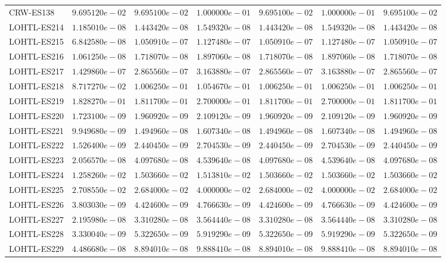 \begin{longtable}{lrrrrrr}
CRW-ES138 & $9.695120e-02$ & $9.695100e-02$ & $1.000000e-01$ & $9.695100e-02$ & $1.000000e-01$ & $9.695100e-02$ \\
LOHTL-ES214 & $1.185010e-08$ & $1.443420e-08$ & $1.549320e-08$ & $1.443420e-08$ & $1.549320e-08$ & $1.443420e-08$ \\
LOHTL-ES215 & $6.842580e-08$ & $1.050910e-07$ & $1.127480e-07$ & $1.050910e-07$ & $1.127480e-07$ & $1.050910e-07$ \\
LOHTL-ES216 & $1.061250e-08$ & $1.718070e-08$ & $1.897060e-08$ & $1.718070e-08$ & $1.897060e-08$ & $1.718070e-08$ \\
LOHTL-ES217 & $1.429860e-07$ & $2.865560e-07$ & $3.163880e-07$ & $2.865560e-07$ & $3.163880e-07$ & $2.865560e-07$ \\
LOHTL-ES218 & $8.717270e-02$ & $1.006250e-01$ & $1.054670e-01$ & $1.006250e-01$ & $1.006250e-01$ & $1.006250e-01$ \\
LOHTL-ES219 & $1.828270e-01$ & $1.811700e-01$ & $2.700000e-01$ & $1.811700e-01$ & $2.700000e-01$ & $1.811700e-01$ \\
LOHTL-ES220 & $1.723100e-09$ & $1.960920e-09$ & $2.109120e-09$ & $1.960920e-09$ & $2.109120e-09$ & $1.960920e-09$ \\
LOHTL-ES221 & $9.949680e-09$ & $1.494960e-08$ & $1.607340e-08$ & $1.494960e-08$ & $1.607340e-08$ & $1.494960e-08$ \\
LOHTL-ES222 & $1.526400e-09$ & $2.440450e-09$ & $2.704530e-09$ & $2.440450e-09$ & $2.704530e-09$ & $2.440450e-09$ \\
LOHTL-ES223 & $2.056570e-08$ & $4.097680e-08$ & $4.539640e-08$ & $4.097680e-08$ & $4.539640e-08$ & $4.097680e-08$ \\
LOHTL-ES224 & $1.258260e-02$ & $1.503660e-02$ & $1.513810e-02$ & $1.503660e-02$ & $1.503660e-02$ & $1.503660e-02$ \\
LOHTL-ES225 & $2.708550e-02$ & $2.684000e-02$ & $4.000000e-02$ & $2.684000e-02$ & $4.000000e-02$ & $2.684000e-02$ \\
LOHTL-ES226 & $3.803030e-09$ & $4.424600e-09$ & $4.766630e-09$ & $4.424600e-09$ & $4.766630e-09$ & $4.424600e-09$ \\
LOHTL-ES227 & $2.195980e-08$ & $3.310280e-08$ & $3.564440e-08$ & $3.310280e-08$ & $3.564440e-08$ & $3.310280e-08$ \\
LOHTL-ES228 & $3.330040e-09$ & $5.322650e-09$ & $5.919290e-09$ & $5.322650e-09$ & $5.919290e-09$ & $5.322650e-09$ \\
LOHTL-ES229 & $4.486680e-08$ & $8.894010e-08$ & $9.888410e-08$ & $8.894010e-08$ & $9.888410e-08$ & $8.894010e-08$ \\

\end{longtable}
